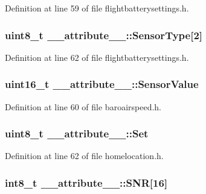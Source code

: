 \-Definition at line 59 of file flightbatterysettings.\-h.

\hypertarget{struct____attribute_____a6ccbef15a2a5346d9aee9af1d7d4dfc1}{
\subsubsection[{\-Sensor\-Type}]{\setlength{\rightskip}{0pt plus 5cm}uint8\-\_\-t {\bf \-\_\-\-\_\-attribute\-\_\-\-\_\-\-::\-Sensor\-Type}\mbox{[}2\mbox{]}}}\label{struct____attribute_____a6ccbef15a2a5346d9aee9af1d7d4dfc1}


\-Definition at line 62 of file flightbatterysettings.\-h.

\hypertarget{struct____attribute_____ac2da95bc62782424db35159750ffd306}{
\subsubsection[{\-Sensor\-Value}]{\setlength{\rightskip}{0pt plus 5cm}uint16\-\_\-t {\bf \-\_\-\-\_\-attribute\-\_\-\-\_\-\-::\-Sensor\-Value}}}\label{struct____attribute_____ac2da95bc62782424db35159750ffd306}


\-Definition at line 60 of file baroairspeed.\-h.

\hypertarget{struct____attribute_____a3d43abcbf9f32657212321af944c192f}{
\subsubsection[{\-Set}]{\setlength{\rightskip}{0pt plus 5cm}uint8\-\_\-t {\bf \-\_\-\-\_\-attribute\-\_\-\-\_\-\-::\-Set}}}\label{struct____attribute_____a3d43abcbf9f32657212321af944c192f}


\-Definition at line 62 of file homelocation.\-h.

\hypertarget{struct____attribute_____a3f0e0b6367f05118c1859622222fa08f}{
\subsubsection[{\-S\-N\-R}]{\setlength{\rightskip}{0pt plus 5cm}int8\-\_\-t {\bf \-\_\-\-\_\-attribute\-\_\-\-\_\-\-::\-S\-N\-R}\mbox{[}16\mbox{]}}}\label{struct____attribute_____a3f0e0b6367f05118c1859622222fa08f}


